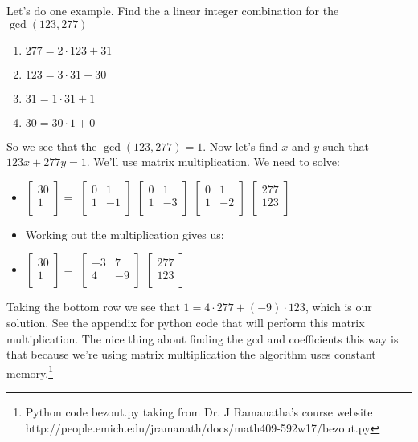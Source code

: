 \documentclass[10pt]{article}
\theoremstyle{definition}
\theoremstyle{remark}
\begin{document}
Let's do one example.
Find the a linear integer combination for the $\gcd(123,277)$
\begin{enumerate}
\item $277 = 2\cdot 123 + 31$
\item $123 = 3\cdot 31 + 30$
\item $31 = 1\cdot 31 + 1$
\item $30 = 30\cdot 1 + 0$
\end{enumerate}
So we see that the $\gcd(123,277)=1$.
Now let's find $x$ and $y$ such that $123x + 277y = 1$.  We'll use matrix multiplication.  We need to solve:
\begin{itemize}
\item $\left[\begin{array}{c}30\\1\\\end{array}\right] = $
$\left[
\begin{array}{cc}
0 & 1 \\
1 & -1\\
\end{array}
\right]$
$\left[
\begin{array}{cc}
0 & 1 \\
1 & -3\\
\end{array}
\right]$
$\left[
\begin{array}{cc}
0 & 1 \\
1 & -2\\
\end{array}
\right]$
$\left[\begin{array}{c}277\\123\\\end{array}\right]$
\item Working out the multiplication gives us:
\item $\left[\begin{array}{c}30\\1\\\end{array}\right] = $
$\left[
\begin{array}{cc}
-3 & 7 \\
4 & -9\\
\end{array}
\right]$
$\left[\begin{array}{c}277\\123\\\end{array}\right]$
\end{itemize}
Taking the bottom row we see that $1 = 4\cdot 277 + (-9)\cdot 123$, which is our solution.
See the appendix for python code that will perform this matrix multiplication.  The nice thing about finding the gcd and coefficients this way is that because we're using matrix multiplication the algorithm uses constant memory.\footnote{Python code bezout.py taking from Dr. J Ramanatha's course website http://people.emich.edu/jramanath/docs/math409-592w17/bezout.py}
\end{document}
